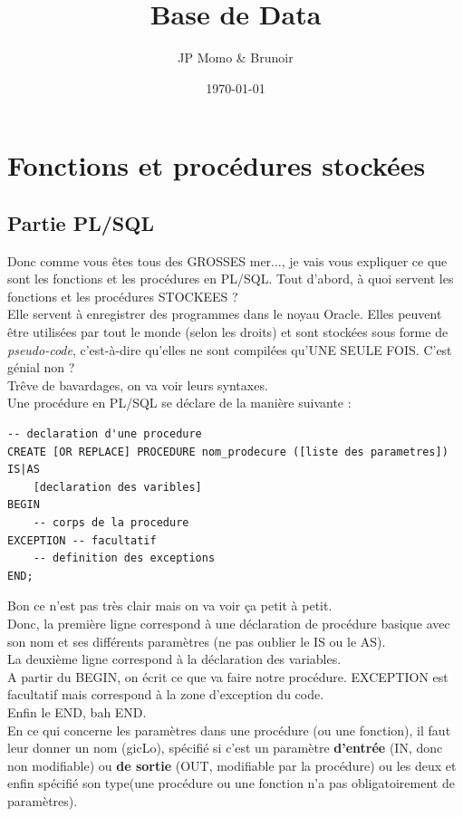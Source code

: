 \documentclass{report}
\title{Base de Data}
\author{JP Momo \& Brunoir}
\date{\today}
\begin{document}
\maketitle{}

\chapter{Fonctions et procédures stockées}
\section{Partie PL/SQL}
Donc comme vous êtes tous des GROSSES mer..., je vais vous expliquer ce que sont les fonctions et les procédures en PL/SQL.
Tout d'abord, à quoi servent les fonctions et les procédures STOCKEES ?\\
Elle servent à enregistrer des programmes dans le noyau Oracle. Elles peuvent être utilisées par tout le monde (selon les droits) et sont stockées sous forme de \textit{pseudo-code}, c'est-à-dire qu'elles ne sont compilées qu'UNE SEULE FOIS. C'est génial non ?\\
Trêve de bavardages, on va voir leurs syntaxes.\\
Une procédure en PL/SQL se déclare de la manière suivante :
\begin{lstlisting}[style=MySQLStyle]
-- declaration d'une procedure
CREATE [OR REPLACE] PROCEDURE nom_prodecure ([liste des parametres]) IS|AS
	[declaration des varibles]
BEGIN
	-- corps de la procedure
EXCEPTION -- facultatif
	-- definition des exceptions
END;
\end{lstlisting}

Bon ce n'est pas très clair mais on va voir ça petit à petit.\\
Donc, la première ligne correspond à une déclaration de procédure basique avec son nom et ses différents paramètres (ne pas oublier le IS ou le AS).\\
La deuxième ligne correspond à la déclaration des variables. \\A partir du BEGIN, on écrit ce que va faire notre procédure. EXCEPTION est facultatif mais correspond à la zone d'exception du code. \\Enfin le END, bah END.\\
En ce qui concerne les paramètres dans une procédure (ou une fonction), il faut leur donner un nom (gicLo), spécifié si c'est un paramètre \textbf{d'entrée} (IN, donc non modifiable) ou \textbf{de sortie} (OUT, modifiable par la procédure) ou les deux et enfin spécifié son type(une procédure ou une fonction n'a pas obligatoirement de paramètres).\\
\end{document}
